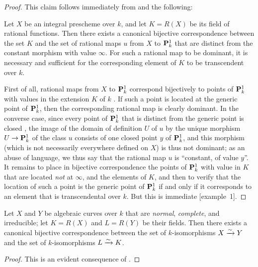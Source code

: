 \begin{proof}
This claim follows immediately from  and the following:
\begin{lemma}
\label{II.7.4.15.1}
Let $X$ be an integral prescheme over $k$, and let $K=R(X)$ be its field of rational functions.
Then there exists a canonical bijective correspondence between the set $K$ and the set of rational maps $u$ from $X$ to $\mathbf{P}_k^1$ that are distinct from the constant morphism with value $\infty$.
For such a rational map to be dominant, it is necessary and sufficient for the corresponding element of $K$ to be transcendent over $k$.
\end{lemma}
First of all, rational maps from $X$ to $\mathbf{P}_k^1$ correspond bijectively to points of $\mathbf{P}_k^1$ with values in the extension $K$ of $k$ .
If such a point is located  at the generic point of $\mathbf{P}_k^1$, then the corresponding rational map is clearly dominant.
In the converse case, since every point of $\mathbf{P}_k^1$ that is distinct from the generic point is closed , the image of the domain of definition $U$ of $u$ by the unique morphism $U\to\bb{P}_k^1$ of the class $u$  consists of one closed point $y$ of $\mathbf{P}_k^1$, and this morphism (which is not necessarily everywhere defined on $X$) is thus not dominant;
as an abuse of language, we thus say that the rational map $u$ is ``constant, of value $y$''.
It remains to place in bijective correspondence the points of $\mathbf{P}_k^1$ with value in $K$ that are located  \emph{not} at $\infty$, and the elements of $K$, and then to verify that the location of such a point is the generic point of $\mathbf{P}_k^1$ if and only if it corresponds to an
element that is transcendental over $k$.
But this is immediate [example~1].
\end{proof}

\begin{corollary}[7.4.16]
\label{II.7.4.16}
Let $X$ and $Y$ be algebraic curves over $k$ that are \emph{normal}, \emph{complete}, and irreducible;
let $K=R(X)$ and $L=R(Y)$ be their fields.
Then there exists a canonical bijective correspondence between the set of $k$-isomorphisms $X\xrightarrow{\sim} Y$ and the set of $k$-isomorphisms $L\xrightarrow{\sim} K$.
\end{corollary}

\begin{proof}
This is an evident consequence of .
\end{proof}

